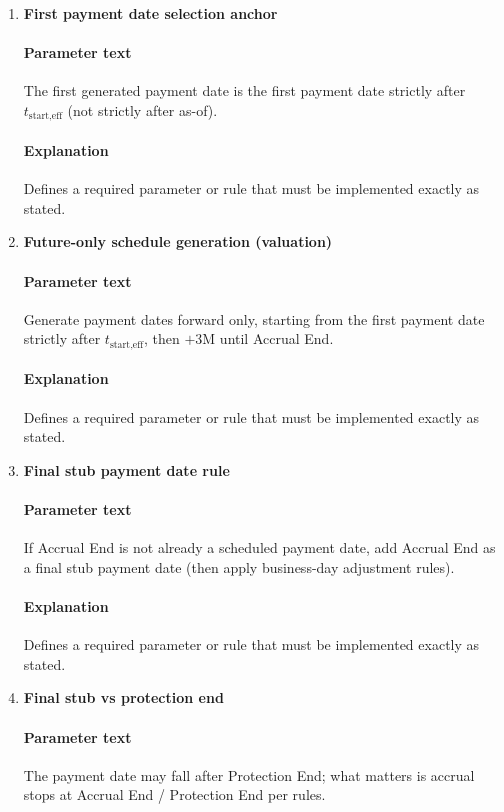 \documentclass[11pt]{article}
\begin{document}
\begin{enumerate}[label=\arabic*),leftmargin=*,align=left]
\paragraph{Explanation} Specifies the checks used to confirm the implementation is internally consistent.

\item \textbf{First payment date selection anchor}
\paragraph{Parameter text} The first generated payment date is the first payment date strictly after $t_{\text{start,eff}}$ (not strictly after as-of).
\paragraph{Explanation} Defines a required parameter or rule that must be implemented exactly as stated.

\item \textbf{Future-only schedule generation (valuation)}
\paragraph{Parameter text} Generate payment dates forward only, starting from the first payment date strictly after $t_{\text{start,eff}}$, then $+3\text{M}$ until Accrual End.
\paragraph{Explanation} Defines a required parameter or rule that must be implemented exactly as stated.

\item \textbf{Final stub payment date rule}
\paragraph{Parameter text} If Accrual End is not already a scheduled payment date, add Accrual End as a final stub payment date (then apply business-day adjustment rules).
\paragraph{Explanation} Defines a required parameter or rule that must be implemented exactly as stated.

\item \textbf{Final stub vs protection end}
\paragraph{Parameter text} The payment date may fall after Protection End; what matters is accrual stops at Accrual End / Protection End per rules.

\end{enumerate}
\end{document}
